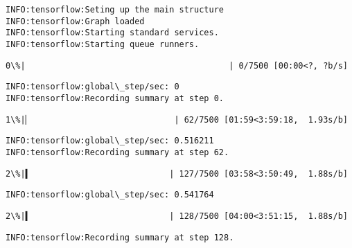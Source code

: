 \documentclass[11pt]{article}
\begin{document}
    \begin{Verbatim}[commandchars=\\\{\}]
INFO:tensorflow:Seting up the main structure
INFO:tensorflow:Graph loaded
INFO:tensorflow:Starting standard services.
INFO:tensorflow:Starting queue runners.

    \end{Verbatim}

    \begin{Verbatim}[commandchars=\\\{\}]
  0\%|                                         | 0/7500 [00:00<?, ?b/s]
    \end{Verbatim}

    \begin{Verbatim}[commandchars=\\\{\}]
INFO:tensorflow:global\_step/sec: 0
INFO:tensorflow:Recording summary at step 0.

    \end{Verbatim}

    \begin{Verbatim}[commandchars=\\\{\}]
  1\%|▏                             | 62/7500 [01:59<3:59:18,  1.93s/b]
    \end{Verbatim}

    \begin{Verbatim}[commandchars=\\\{\}]
INFO:tensorflow:global\_step/sec: 0.516211
INFO:tensorflow:Recording summary at step 62.

    \end{Verbatim}

    \begin{Verbatim}[commandchars=\\\{\}]
  2\%|▍                            | 127/7500 [03:58<3:50:49,  1.88s/b]
    \end{Verbatim}

    \begin{Verbatim}[commandchars=\\\{\}]
INFO:tensorflow:global\_step/sec: 0.541764

    \end{Verbatim}

    \begin{Verbatim}[commandchars=\\\{\}]
  2\%|▍                            | 128/7500 [04:00<3:51:15,  1.88s/b]
    \end{Verbatim}

    \begin{Verbatim}[commandchars=\\\{\}]
INFO:tensorflow:Recording summary at step 128.

    \end{Verbatim}
\end{document}
